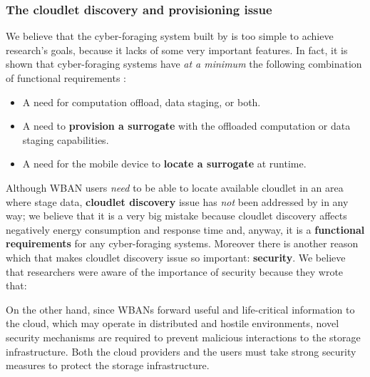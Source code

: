 \documentclass[sigchi]{acmart}
\begin{document}
\subsubsection{The cloudlet discovery and provisioning issue}

We believe that the cyber-foraging system built by \citet{MSAReport} is too simple to achieve research's goals, because it lacks of some very important features. In fact, it is shown that cyber-foraging systems have \textit{at a minimum} the following combination of functional requirements \cite{DecisionModel}:

\begin{itemize}

\item  A need for computation offload, data staging, or both.
\item  A need to \textbf{provision a surrogate} with the offloaded computation or data staging capabilities.
\item  A need for the mobile device to \textbf{locate a surrogate} at runtime.

\end{itemize}

Although WBAN users \textit{need} to be able to locate available cloudlet in an area where stage data, \textbf{cloudlet discovery} issue has \textit{not} been addressed by \citet{MSAReport} in any way; we believe that it is a very big mistake because cloudlet discovery affects negatively energy consumption and response time and, anyway, it is a \textbf{functional requirements} for any cyber-foraging systems. Moreover there is another reason which that makes cloudlet discovery issue so important: \textbf{security}. We believe that researchers were aware of the importance of security because they wrote that:

\vspace{0.3cm}

\begin{quoting}[font=itshape, begintext={``}, endtext={''\cite[par.~3.3]{MSAReport}}]
On the other hand, since WBANs forward useful and life-critical information to the cloud, which may operate in distributed and hostile environments, novel security mechanisms are required to prevent malicious interactions to the storage infrastructure. Both the cloud providers and the users must take strong security measures to protect the storage infrastructure.
\end{quoting}

\vspace{0.3cm}
\end{document}
